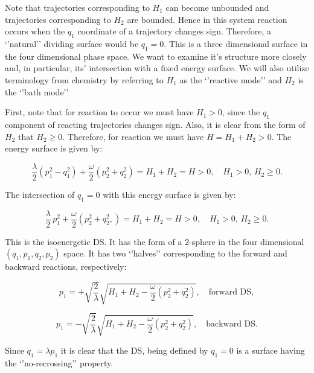 \documentclass{article}
\begin{document}
Note that trajectories corresponding to $H_1$ can become unbounded and trajectories corresponding to $H_2$ are bounded.  Hence in  this system reaction occurs when  the $q_1$ coordinate of a trajectory changes sign. Therefore, a `'natural'' dividing surface would be $q_1 =0$. This is a three dimensional surface in the four dimensional phase space. We want to examine it's structure more closely and, in particular, its' intersection with a fixed energy surface. We will also utilize terminology from chemistry by referring to  $H_1$ as the `'reactive mode'' and $H_2$ is the `'bath mode''


First, note that for reaction to occur we must have $H_1 >0$, since the $q_1$ component of reacting trajectories changes sign. Also, it is clear  from  the form of $H_2$ that $H_2 \ge 0$. Therefore, for reaction we must have $H = H_1 + H_2 >0$. The energy surface is given by:

\begin{equation}
\frac{\lambda}{2} \left(p_1^2 - q_1^2 \right) + \frac{\omega}{2} \left(p_2^2 + q_2^2 \right) = H_1 + H_2 = H > 0, \quad H_1 > 0, \, H_2 \ge 0.
\label{2DoFES}
\end{equation}

\noindent
The intersection of $q_1=0$ with this energy surface is given by:



\begin{equation}
\frac{\lambda}{2} \, p_1^2  + \frac{\omega}{2} \left(p_2^2 + q_2^2, \right) = H_1 + H_2 = H > 0, \quad H_1 > 0, \, H_2 \ge 0.
\label{2DoDS}
\end{equation}

\noindent
This is the isoenergetic DS. It has the form of a 2-sphere in the four dimensional $(q_1, p_1, q_2, p_2)$ space. It has two `'halves'' corresponding to the forward and backward reactions, respectively:

\begin{equation}
p_1 = + \sqrt{\frac{2}{\lambda}} \sqrt{H_1 + H_2 - \frac{\omega}{2} \left(p_2^2 + q_2^2 \right) }, \quad \mbox{forward DS},
\end{equation}

\begin{equation}
p_1 = - \sqrt{\frac{2}{\lambda}} \sqrt{H_1 + H_2 - \frac{\omega}{2} \left(p_2^2 + q_2^2 \right) }, \quad \mbox{backward DS}.
\end{equation}

\noindent
Since $\dot{q}_1 = \lambda p_1$ it is clear that the DS, being defined by $q_1=0$ is a surface  having the `'no-recrossing'' property.
\end{document}
